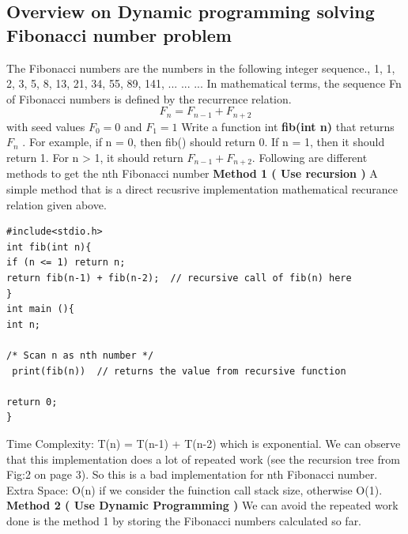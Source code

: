 \documentclass[12pt]{article}
\begin{document}
{\subsection{Overview on Dynamic programming solving Fibonacci number problem}
The Fibonacci numbers are the numbers in the following integer sequence., 1, 1, 2, 3, 5, 8, 13, 21, 34, 55, 89, 141, ... ... ... \newline
In mathematical terms, the sequence Fn of Fibonacci numbers is defined by the recurrence relation.
\[ F_n =  F_{n-1} + F_{n+2} \]
with seed values
$ F_0 = 0$  and  $ F_1 = 1 $
Write a function int \textbf{fib(int n)} that returns $F_n$ . For example, if n = 0, then fib() should return 0. If n = 1, then it should return 1. For n > 1, it should return $F_{n-1} + F_{n+2} $.
\newline
Following are different methods to get the nth Fibonacci number\vspace{6mm}
\newline
\textbf{Method 1 ( Use recursion )}
\vspace{3mm}
\newline
A simple method that is a direct recusrive implementation mathematical recurance relation given above.
\vspace{3mm}
\begin{lstlisting}
#include<stdio.h>
int fib(int n){
if (n <= 1) return n;
return fib(n-1) + fib(n-2);  // recursive call of fib(n) here 
}
int main (){
int n;

/* Scan n as nth number */
 print(fib(n))  // returns the value from recursive function

return 0;
}
\end{lstlisting}

Time Complexity: T(n) = T(n-1) + T(n-2) which is exponential. \newline
We can observe that this implementation does a lot of repeated work (see the recursion tree from Fig:2 on page 3). So this is a bad implementation for nth Fibonacci number.\newline
Extra Space: O(n) if we consider the fuinction call stack size, otherwise O(1).
\vspace{6mm}
\newline
\textbf{Method 2 ( Use Dynamic Programming )}
\vspace{3mm}
\newline
We can avoid the repeated work done is the method 1 by storing the Fibonacci numbers
calculated so far.
\begin{lstlisting}


\end{lstlisting}}
\end{document}
